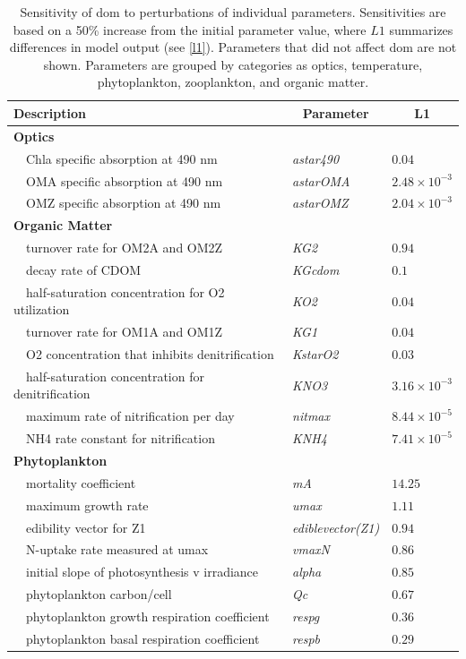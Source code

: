 \documentclass[review]{elsarticle}\usepackage[]{graphicx}\usepackage[]{color}
\begin{document}
\begin{table}[!tbp]
{\footnotesize
\caption{Sensitivity of \acl{dom} to perturbations of individual parameters.  Sensitivities are based on a 50\% increase from the initial parameter value, where $L1$ summarizes differences in model output (see \cref{l1}).  Parameters that did not affect \acl{dom} are not shown.  Parameters are grouped by categories as optics, temperature, phytoplankton, zooplankton, and organic matter.\label{tab:om2sens}} 
\begin{center}
\begin{tabular}{lll}
\hline\hline
\multicolumn{1}{l}{Description}&\multicolumn{1}{c}{Parameter}&\multicolumn{1}{c}{L1}\tabularnewline
\hline
{\bfseries Optics}&&\tabularnewline
~~Chla specific absorption at 490 nm&\textit{astar490}&$0.04$\tabularnewline
~~OMA specific absorption at 490 nm&\textit{astarOMA}&$2.48\times 10^{-3}$\tabularnewline
~~OMZ specific absorption at 490 nm&\textit{astarOMZ}&$2.04\times 10^{-3}$\tabularnewline
\hline
{\bfseries Organic Matter}&&\tabularnewline
~~turnover rate for OM2A and OM2Z&\textit{KG2}&$0.94$\tabularnewline
~~decay rate of CDOM&\textit{KGcdom}&$0.1$\tabularnewline
~~half-saturation concentration for O2 utilization&\textit{KO2}&$0.04$\tabularnewline
~~turnover rate for OM1A and OM1Z&\textit{KG1}&$0.04$\tabularnewline
~~O2 concentration that inhibits denitrification&\textit{KstarO2}&$0.03$\tabularnewline
~~half-saturation concentration for denitrification&\textit{KNO3}&$3.16\times 10^{-3}$\tabularnewline
~~maximum rate of nitrification per day&\textit{nitmax}&$8.44\times 10^{-5}$\tabularnewline
~~NH4 rate constant for nitrification&\textit{KNH4}&$7.41\times 10^{-5}$\tabularnewline
\hline
{\bfseries Phytoplankton}&&\tabularnewline
~~mortality coefficient&\textit{mA}&$14.25$\tabularnewline
~~maximum growth rate&\textit{umax}&$1.11$\tabularnewline
~~edibility vector for Z1&\textit{ediblevector(Z1)}&$0.94$\tabularnewline
~~N-uptake rate measured at umax&\textit{vmaxN}&$0.86$\tabularnewline
~~initial slope of photosynthesis v irradiance&\textit{alpha}&$0.85$\tabularnewline
~~phytoplankton carbon/cell&\textit{Qc}&$0.67$\tabularnewline
~~phytoplankton growth respiration coefficient&\textit{respg}&$0.36$\tabularnewline
~~phytoplankton basal respiration coefficient&\textit{respb}&$0.29$\tabularnewline

\end{tabular}
\end{center}}
\end{table}
\end{document}
